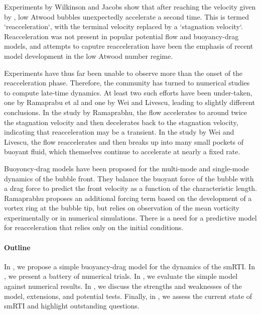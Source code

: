 Experiments by Wilkinson and Jacobs show that after reaching the velocity given by , low Atwood bubbles unexpectedly accelerate a second time.
This is termed `reacceleration`, with the terminal velocity replaced by a `stagnation velocity`.
Reacceleration was not present in popular potential flow and buoyancy-drag models, and attempts to caputre reacceleration have been the emphasis of recent model development in the low Atwood number regime.

Experiments have thus far been unable to observe more than the onset of the reacceleration phase.
Therefore, the community has turned to numerical studies to compute late-time dynamics.
At least two such efforts have been under-taken, one by Ramaprabu et al and one by Wei and Livescu, leading to slightly different conclusions.
In the study by Ramaprabhu, the flow accelerates to around twice the stagnation velocity and then decelerates back to the stagnation velocity, indicating that reacceleration may be a transient.
In the study by Wei and Livescu, the flow reaccelerates and then breaks up into many small pockets of buoyant fluid, which themselves continue to accelerate at nearly a fixed rate.

Buoyoncy-drag models have been proposed for the multi-mode and single-mode dynamics of the bubble front.
They balance the buoyant force of the bubble with a drag force to predict the front velocity as a function of the characteristic length.
Ramaprabhu proposes an additional forcing term based on the development of a vortex ring at the bubble tip, but relies on observation of the mean vorticity experimentally or in numerical simulations.
There is a need for a predictive model for reacceleration that relies only on the initial conditions.

\paragraph{Outline}
In , we propose a simple buoyancy-drag model for the dynamics of the smRTI.
In , we present a battery of numerical trials.
In , we evaluate the simple model against numerical results.
In , we discuss the strengths and weaknesses of the model, extensions, and potential tests.
Finally, in , we assess the current state of smRTI and highlight outstanding questions.

